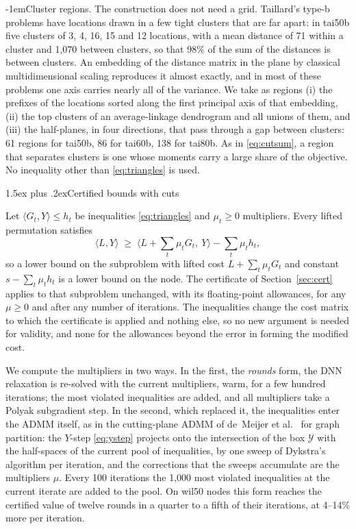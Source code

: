 \documentclass[10pt]{article}
\makeatletter
\renewcommand\subsection{\@startsection{subsection}{2}{\z@}{-3.25ex plus -1ex minus -.2ex}%
  {1.5ex plus .2ex}{\normalfont\normalsize\bfseries}}
\renewcommand\paragraph{\@startsection{paragraph}{4}{\z@}{2.5ex plus 1ex minus .2ex}%
  {-1em}{\normalfont\normalsize\bfseries}}
\theoremstyle{remark}
\newcommand{\inner}[2]{\langle #1, #2\rangle}
\makeatother
\begin{document}
\paragraph{Cluster regions.} The construction does not need a grid. Taillard's
type-b problems \cite{taillard} have locations drawn in a few tight clusters that
are far apart: in tai50b five clusters of 3, 4, 16, 15 and 12 locations, with a
mean distance of 71 within a cluster and 1,070 between clusters, so that 98\% of
the sum of the distances is between clusters. An embedding of the distance matrix in
the plane by classical multidimensional scaling reproduces it almost exactly, and in
most of these problems one axis carries nearly all of the variance. We take as
regions (i) the prefixes of the locations sorted along the first principal axis of
that embedding, (ii) the top clusters of an average-linkage dendrogram and all
unions of them, and (iii) the half-planes, in four directions, that pass through a
gap between clusters: 61 regions for tai50b, 86 for tai60b, 138 for tai80b. As in
\eqref{eq:cutsum}, a region that separates clusters is one whose moments carry a
large share of the objective. No inequality other than \eqref{eq:triangles} is
used.

\subsection{Certified bounds with cuts}\label{sec:cutcert}

Let $\inner{G_t}{Y}\le h_t$ be inequalities \eqref{eq:triangles} and $\mu_t\ge0$
multipliers. Every lifted permutation satisfies
\[
  \inner{L}{Y} \;\ge\; \Big\langle L + \sum_t\mu_tG_t,\ Y\Big\rangle - \sum_t\mu_th_t ,
\]
so a lower bound on the subproblem with lifted cost $L + \sum_t\mu_tG_t$ and constant
$s - \sum_t\mu_th_t$ is a lower bound on the node. The certificate of
Section~\ref{sec:cert} applies to that subproblem unchanged, with its
floating-point allowances, for any $\mu\ge0$ and after any number of iterations. The
inequalities change the cost matrix to which the certificate is applied and nothing
else, so no new argument is needed for validity, and none for the allowances beyond
the error in forming the modified cost.

We compute the multipliers in two ways. In the first, the \emph{rounds} form, the
DNN relaxation is re-solved with the current multipliers, warm, for a few hundred
iterations; the most violated inequalities are added, and all multipliers take a
Polyak subgradient step. In the second, which replaced it, the inequalities enter
the ADMM itself, as in the cutting-plane ADMM of de~Meijer et al.\ \cite{demeijer}
for graph partition: the $Y$-step \eqref{eq:ystep} projects onto the intersection of
the box $\mathcal{Y}$ with the half-spaces of the current pool of inequalities, by
one sweep of Dykstra's algorithm \cite{dykstra} per iteration, and the corrections
that the sweeps accumulate are the multipliers $\mu$. Every 100 iterations the
1,000 most violated inequalities at the current iterate are added to the pool.
On wil50 nodes this form reaches the certified value of twelve rounds in a quarter
to a fifth of their iterations, at 4--14\% more per iteration.
\end{document}
